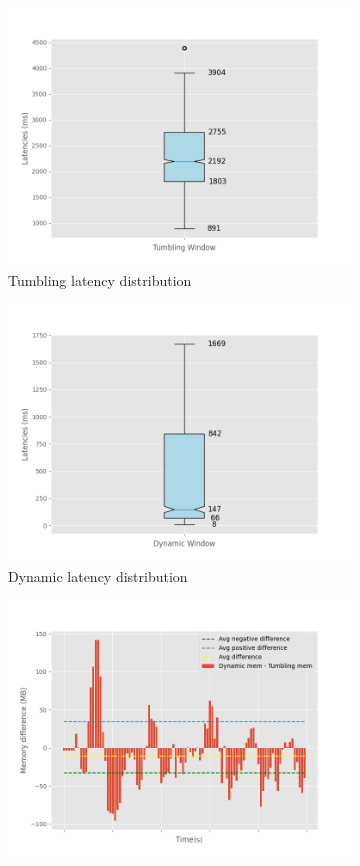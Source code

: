 \begin{figure}
\begin{subfigure}[b]{0.5\columnwidth}
        \includegraphics[width=\columnwidth]{fig/periodic/TumblingWindow_latency_boxplot.png}
        \caption{Tumbling latency distribution}
        \label{fig:periodic_tumb_boxplot}
    \end{subfigure}
    \hfill 
    \begin{subfigure}[b]{0.5\columnwidth}
        \includegraphics[width=\columnwidth]{fig/periodic/DynamicWindow_latency_boxplot.png}
        \caption{Dynamic latency distribution}
        \label{fig:periodic_dynamic_boxplot}
    \end{subfigure}
    \begin{subfigure}[b]{\columnwidth}
        \centering
        \includegraphics[width=0.7\columnwidth]{fig/periodic/mem_difference_bar.png}

\end{subfigure}
\end{figure}
